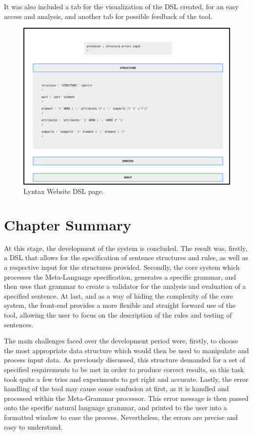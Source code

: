 It was also included a tab for the visualization of the \textsc{DSL} created, for an easy access and analysis, and another tab for possible feedback of the tool.
\begin{figure}[h]
    \centering
    \includegraphics[width=12cm]{images/lyntax-website-dsl.png}
    \caption{Lyntax Website DSL page.}
    \label{fig:lyntaxWebsiteDSL}
\end{figure}

\newpage
\section{Chapter Summary}

At this stage, the development of the system is concluded.
The result was, firstly, a DSL that allows for the specification of sentence structures and rules, as well as a respective input for the structures provided.
Secondly, the core system which processes the Meta-Language specification, generates a specific grammar, 
and then uses that grammar to create a validator for the analysis and evaluation of a specified sentence.
At last, and as a way of hiding the complexity of the core system, 
the front-end provides a more flexible and straight forward use of the tool,
allowing the user to focus on the description of the rules and testing of sentences.

The main challenges faced over the development period were, firstly,
to choose the most appropriate data structure which would then be used to manipulate and process input data.
As previously discussed, this structure demanded for a set of specified requirements to be met in order to produce correct results, 
so this task took quite a few tries and experiments to get right and accurate.
Lastly, the error handling of the tool may cause some confusion at first, as it is handled and processed within the Meta-Grammar processor.
This error message is then passed onto the specific natural language grammar, and printed to the user into a formatted window to ease the process.
Nevertheless, the errors are precise and easy to understand.

